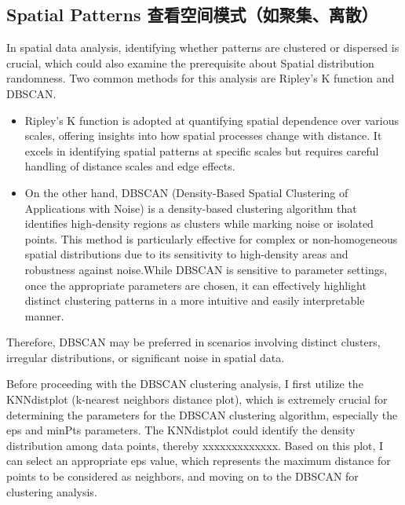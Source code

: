 \documentclass[
]{article}
\providecommand{\tightlist}{%
  \setlength{\itemsep}{0pt}\setlength{\parskip}{0pt}}
\begin{document}
\hypertarget{spatial-patterns-ux67e5ux770bux7a7aux95f4ux6a21ux5f0fux5982ux805aux96c6ux79bbux6563}{%
\subsection{Spatial Patterns
查看空间模式（如聚集、离散）}\label{spatial-patterns-ux67e5ux770bux7a7aux95f4ux6a21ux5f0fux5982ux805aux96c6ux79bbux6563}}

In spatial data analysis, identifying whether patterns are clustered or
dispersed is crucial, which could also examine the prerequisite about
Spatial distribution randomness. Two common methods for this analysis
are Ripley's K function and DBSCAN.

\begin{itemize}
\tightlist
\item
  Ripley's K function is adopted at quantifying spatial dependence over
  various scales, offering insights into how spatial processes change
  with distance. It excels in identifying spatial patterns at specific
  scales but requires careful handling of distance scales and edge
  effects.
\item
  On the other hand, DBSCAN (Density-Based Spatial Clustering of
  Applications with Noise) is a density-based clustering algorithm that
  identifies high-density regions as clusters while marking noise or
  isolated points. This method is particularly effective for complex or
  non-homogeneous spatial distributions due to its sensitivity to
  high-density areas and robustness against noise.While DBSCAN is
  sensitive to parameter settings, once the appropriate parameters are
  chosen, it can effectively highlight distinct clustering patterns in a
  more intuitive and easily interpretable manner.
\end{itemize}

Therefore, DBSCAN may be preferred in scenarios involving distinct
clusters, irregular distributions, or significant noise in spatial data.

Before proceeding with the DBSCAN clustering analysis, I first utilize
the KNNdistplot (k-nearest neighbors distance plot), which is extremely
crucial for determining the parameters for the DBSCAN clustering
algorithm, especially the eps and minPts parameters. The KNNdistplot
could identify the density distribution among data points, thereby
xxxxxxxxxxxxx. Based on this plot, I can select an appropriate eps
value, which represents the maximum distance for points to be considered
as neighbors, and moving on to the DBSCAN for clustering analysis.
\end{document}
